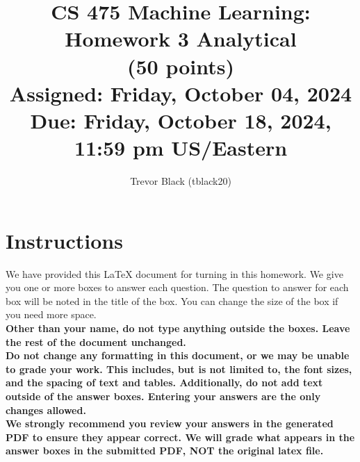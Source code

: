 \documentclass[11pt]{article}
\title{CS 475 Machine Learning: Homework 3 Analytical \\
(50 points)\\
\Large{Assigned: Friday, October 04, 2024} \\
\Large{Due: Friday, October 18, 2024, 11:59 pm US/Eastern}}
\author{Trevor Black (tblack20)}
\date{}
\renewcommand{\vec}[1]{\mathbf{#1}}
\begin{document}
\maketitle
\thispagestyle{headings}

\section*{Instructions }
We have provided this \LaTeX{} document for turning in this homework. We give you one or more boxes to answer each question.  The question to answer for each box will be noted in the title of the box.  You can change the size of the box if you need more space.\\

{\bf Other than your name, do not type anything outside the boxes. Leave the rest of the document unchanged.}\\


\textbf{Do not change any formatting in this document, or we may be unable to
  grade your work. This includes, but is not limited to, the font sizes, and the spacing of text and tables.  Additionally, do
  not add text outside of the answer boxes. Entering your answers are the only
  changes allowed.}\\


\textbf{We strongly recommend you review your answers in the generated PDF to
  ensure they appear correct. We will grade what appears in the answer boxes in
  the submitted PDF, NOT the original latex file.}

\end{document}
